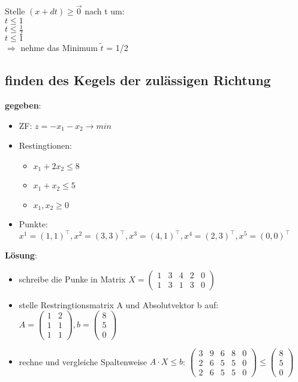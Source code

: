 \documentclass[12pt,a4paper, hyperref]{article}
\newcommand{\tsnake}[1]{\ensuremath{\tilde{#1}}}
\begin{document}
Stelle $(x+dt) \geq \vec{0}$ nach t um:\\ 
$t \leq 1$\\
$t \leq \frac{1}{2}$\\
$t \leq 1$\\
$\Rightarrow$ nehme das Minimum
\tsnake t = 1/2

\subsection{finden des Kegels der zulässigen Richtung}
\textbf{gegeben}:
\begin{itemize}
\item ZF: $ z = -x_1 - x_2 \rightarrow min$
\item Restingtionen:
\begin{itemize}
\item $x_1 + 2x_2 \leq 8$
\item $x_1 + x_2 \leq 5$
\item $x_1,x_2 \geq 0$
\end{itemize} 
\item Punkte: $x^1 = (1, 1)^\intercal, x^2 = (3, 3)^\intercal, x^3 = (4, 1)^\intercal, x^4 = (2, 3)^\intercal, x^5 = (0, 0)^\intercal$
\end{itemize}
\textbf{Lösung}:
\begin{itemize}
\item schreibe die Punke in Matrix $X = \begin{pmatrix}1 & 3 & 4 & 2 & 0 \\
 1 & 3 & 1 & 3 & 0
\end{pmatrix} $
\item stelle Restringtionsmatrix A und Absolutvektor b auf: $A = \begin{pmatrix}
1 & 2 \\ 1 & 1 \\ 1 & 1
\end{pmatrix}, b = \begin{pmatrix}
8 \\ 5 \\ 0
\end{pmatrix}$

\item rechne und vergleiche Spaltenweise $A\cdot X \leq b$: $\begin{pmatrix}
3 & 9 & 6 & 8 & 0 \\ 2 & 6 & 5 & 5 & 0 \\ 2 & 6 & 5 & 5 & 0 \end{pmatrix} \leq \begin{pmatrix}
8 \\ 5 \\ 0
\end{pmatrix}$
\end{itemize}
\end{document}
